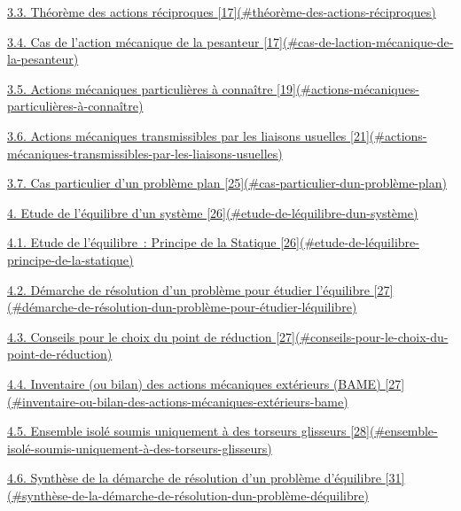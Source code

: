 \protect\hyperlink{thuxe9oruxe8me-des-actions-ruxe9ciproques}{3.3. Théorème des actions réciproques {[}17{]}(\#théorème-des-actions-réciproques)}

\protect\hyperlink{cas-de-laction-muxe9canique-de-la-pesanteur}{3.4. Cas de l'action mécanique de la pesanteur {[}17{]}(\#cas-de-laction-mécanique-de-la-pesanteur)}

\protect\hyperlink{actions-muxe9caniques-particuliuxe8res-uxe0-connauxeetre}{3.5. Actions mécaniques particulières à connaître {[}19{]}(\#actions-mécaniques-particulières-à-connaître)}

\protect\hyperlink{actions-muxe9caniques-transmissibles-par-les-liaisons-usuelles}{3.6. Actions mécaniques transmissibles par les liaisons usuelles {[}21{]}(\#actions-mécaniques-transmissibles-par-les-liaisons-usuelles)}

\protect\hyperlink{cas-particulier-dun-probluxe8me-plan}{3.7. Cas particulier d'un problème plan {[}25{]}(\#cas-particulier-dun-problème-plan)}

\protect\hyperlink{etude-de-luxe9quilibre-dun-systuxe8me}{4. Etude de l'équilibre d'un système {[}26{]}(\#etude-de-léquilibre-dun-système)}

\protect\hyperlink{etude-de-luxe9quilibre-principe-de-la-statique}{4.1. Etude de l'équilibre~: Principe de la Statique {[}26{]}(\#etude-de-léquilibre-principe-de-la-statique)}

\protect\hyperlink{duxe9marche-de-ruxe9solution-dun-probluxe8me-pour-uxe9tudier-luxe9quilibre}{4.2. Démarche de résolution d'un problème pour étudier l'équilibre {[}27{]}(\#démarche-de-résolution-dun-problème-pour-étudier-léquilibre)}

\protect\hyperlink{conseils-pour-le-choix-du-point-de-ruxe9duction}{4.3. Conseils pour le choix du point de réduction {[}27{]}(\#conseils-pour-le-choix-du-point-de-réduction)}

\protect\hyperlink{inventaire-ou-bilan-des-actions-muxe9caniques-extuxe9rieurs-bame}{4.4. Inventaire (ou bilan) des actions mécaniques extérieurs (BAME) {[}27{]}(\#inventaire-ou-bilan-des-actions-mécaniques-extérieurs-bame)}

\protect\hyperlink{ensemble-isoluxe9-soumis-uniquement-uxe0-des-torseurs-glisseurs}{4.5. Ensemble isolé soumis uniquement à des torseurs glisseurs {[}28{]}(\#ensemble-isolé-soumis-uniquement-à-des-torseurs-glisseurs)}

\protect\hyperlink{synthuxe8se-de-la-duxe9marche-de-ruxe9solution-dun-probluxe8me-duxe9quilibre}{4.6. Synthèse de la démarche de résolution d'un problème d'équilibre {[}31{]}(\#synthèse-de-la-démarche-de-résolution-dun-problème-déquilibre)}

